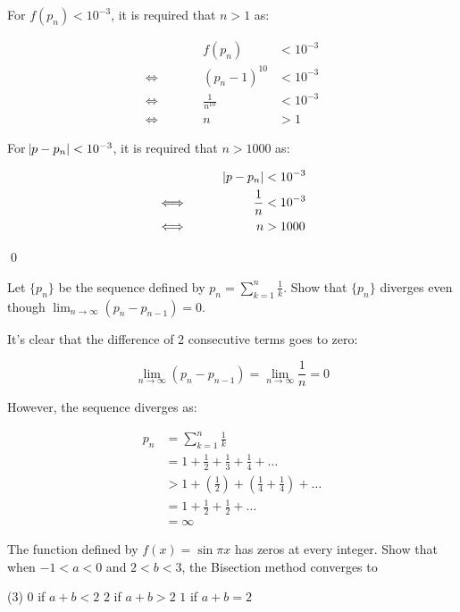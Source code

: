 \documentclass[../../../../Assignments.tex]{subfiles}
\begin{document}
\begin{solution}
    For \(f(p_n) < 10^{-3}\), it is required that \(n > 1\) as:

    \begin{align*}
        &\qquad&         f(p_n) & < 10^{-3} \\
        \iff&&   (p_n - 1)^{10} & < 10^{-3} \\
        \iff&& \frac{1}{n^{10}} & < 10^{-3} \\
        \iff&&                n & > 1
    \end{align*}

    For \(\abs{p - p_n} < 10^{-3}\), it is required that \(n > 1000\) as:

    \begin{align*}
        &\qquad& \abs{p - p_n} & < 10^{-3} \\
        \iff&&     \frac{1}{n} & < 10^{-3} \\
        \iff&&               n & > 1000
    \end{align*}

    \qed
\end{solution}

\begin{exercise}
    Let \(\{p_n\}\) be the sequence defined by \(p_n = \sum_{k = 1}^{n}
    \frac{1}{k}\). Show that \(\{p_n\}\) diverges even though \(\lim_{n \to
    \infty} (p_n - p_{n - 1}) = 0\).
\end{exercise}

\begin{solution}
    It's clear that the difference of 2 consecutive terms goes to zero:

    \[\lim_{n \to \infty} (p_n - p_{n - 1}) = \lim_{n \to \infty} \frac{1}{n} = 0\]

    However, the sequence diverges as:

    \begin{align*}
        p_n & = \sum_{k = 1}^{n} \frac{1}{k} \\
            & = 1 + \frac{1}{2} + \frac{1}{3} + \frac{1}{4} + \ldots \\
            & > 1 + (\frac{1}{2}) + (\frac{1}{4} + \frac{1}{4}) + \ldots \\
            & = 1 + \frac{1}{2} + \frac{1}{2} + \ldots \\
            & = \infty
    \end{align*}
\end{solution}

\begin{exercise}
    The function defined by \(f(x) = \sin{\pi x}\) has zeros at every integer.
    Show that when \(-1 < a < 0\) and \(2 < b < 3\), the Bisection method
    converges to

    \begin{tasks}(3)
        \task \(0\) if \(a + b < 2\)
        \task \(2\) if \(a + b > 2\)
        \task \(1\) if \(a + b = 2\)
    \end{tasks}
\end{exercise}
\end{document}
